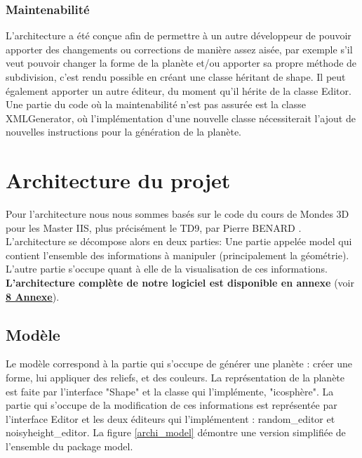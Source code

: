 \documentclass[a4paper]{article}
\begin{document}
\subsubsection{Maintenabilité}
L'architecture a été conçue afin de permettre à un autre développeur de pouvoir apporter des changements ou corrections de manière assez aisée, par exemple s'il veut pouvoir changer la forme de la planète et/ou apporter sa propre méthode de subdivision, c'est rendu possible en créant une classe héritant de shape.
Il peut également apporter un autre éditeur, du moment qu'il hérite de la classe Editor.
Une partie du code où la maintenabilité n'est pas assurée est la classe XMLGenerator, où l'implémentation d'une nouvelle classe nécessiterait l'ajout de nouvelles instructions pour la génération de la planète.


\newpage 
\section{Architecture du projet}


Pour l'architecture nous nous sommes basés sur le code du cours de Mondes 3D pour les Master IIS, plus précisément le TD9, par Pierre BENARD \cite{TD_3D}. L'architecture se décompose alors en deux parties: Une partie appelée model qui contient l'ensemble des informations à manipuler (principalement la géométrie). L'autre partie s'occupe quant à elle de la visualisation de ces informations. \textbf{L'architecture complète de notre logiciel est disponible en annexe} (voir \hyperref[archiComplete]{\textbf{8 Annexe}}). 
\\


\subsection{Modèle}
Le modèle correspond à la partie qui s'occupe de générer une planète : créer une forme, lui appliquer des reliefs, et des couleurs. La représentation de la planète est faite par l'interface "Shape" et la classe qui l'implémente, "icosphère". La partie qui s'occupe de la modification de ces informations est représentée par l'interface Editor et les deux éditeurs qui l'implémentent : random\_editor et noisyheight\_editor. La figure \ref{archi_model} démontre une version simplifiée de l'ensemble du package model.\\
\end{document}
